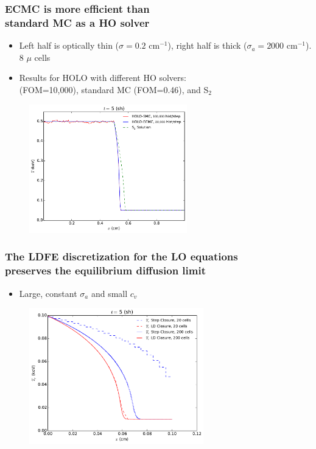 \documentclass[xcolor=dvipsnames,hyperref={pdfpagelabels=false},unknownkeysallowed]{beamer}
\newcommand{\colg}[1]{{\color{ForestGreen} #1}}
\newcommand{\colb}[1]{{\color{blue} #1}}
\newcommand{\colG}[1]{{\color{Gray!110} #1}}
\newcommand{\colr}[1]{{\color{red} #1}}
\newlength{\wideitemsep}
\let\olditem\item
\renewcommand{\item}{\setlength{\itemsep}{\wideitemsep}\olditem}
\begin{document}
\begin{frame}
    \frametitle{ECMC is more efficient than\\
 standard MC  as a HO solver }
{\addtolength\leftmargini{-0.345in}
    \centering
        \fontsize{10.0pt}{10.2pt}\selectfont
        \vspace{0.1in}
        \begin{itemize}
            \item Left half is optically thin ($\sigma\!=\!0.2$ cm$^{-1}$),
                right half is thick ($\sigma_a\!=\!2000$ cm$^{-1}$). \colG{8 $\mu$ cells}
            \item Results for HOLO with different HO solvers:\\
                \vspace{0.03in}\colb{ECMC} (FOM=10,000),  \colr{ standard MC}
                (FOM=0.46), and \colg{ S$_2$}
        \end{itemize}
    \begin{figure}
        \vspace{-0.1in}
    \includegraphics[width=0.6099\textwidth]{two_mat_ho_compare.pdf}
    \centering
    \end{figure}
}
\end{frame}

\begin{frame}
    \frametitle{The LDFE discretization for the LO equations \\ preserves the equilibrium diffusion limit}
        \begin{itemize}
            \item \colG{Large, constant $\sigma_a$ and small $c_v$}
        \end{itemize}
\begin{figure}
    \centering
    \includegraphics[width=0.6755799\textwidth]{diff_limit_compare.pdf}
\end{figure}
\end{frame}
\end{document}
